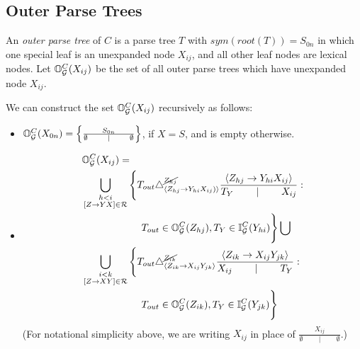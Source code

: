 \subsection{Outer Parse Trees}

\begin{defn}
  An \emph{outer parse tree} of $C$ is a parse tree $T$ with
  $sym(root(T)) = S_{0n}$ in which one special leaf is an unexpanded node
  $X_{ij}$, and all other leaf nodes are lexical nodes. Let
  $\mathbb{O}_{{\mathcal G}}^C(X_{ij})$ be the set of all outer parse trees which
  have unexpanded node $X_{ij}$.
\end{defn}

\begin{prop}
\label{prop-outer-set}
  We can construct the set $\mathbb{O}_{{\mathcal G}}^C(X_{ij})$ recursively as
  follows:
\begin{itemize}
\item $\mathbb{O}_{{\mathcal G}}^C(X_{0n}) = \left\{ \frac{S_{0n}}{\emptyset \qquad
      \mid \qquad \emptyset} \right\}$, if $X=S$, and is empty otherwise.
\item 
\begin{align*}
&\mathbb{O}_{{\mathcal G}}^C(X_{ij}) = \\
&\bigcup_{\substack{h < i \\ [Z \to YX]\in {\mathcal R}}}
\Bigg\{
T_{out} \triangle^{\cancel{Z_{hj}}}_{\langle Z_{hj} \to Y_{hi}
  X_{ij})\rangle} \frac{ \langle Z_{hj} \to Y_{hi}
  X_{ij} \rangle}{ T_Y \qquad \mid \qquad X_{ij}} : \\
&\qquad\qquad\qquad T_{out} \in \mathbb{O}_{{\mathcal G}}^C(Z_{hj}), T_Y \in \mathbb{I}_{{\mathcal G}}^C(Y_{hi}) 
\Bigg\} \bigcup\\
&\bigcup_{\substack{i < k \\ [Z \to
    XY]\in {\mathcal R}}}
\Bigg\{
T_{out} \triangle^{\cancel{Z_{ik}}}_{\langle Z_{ik} \to X_{ij} Y_{jk}
  \rangle} \frac{ \langle Z_{ik} \to X_{ij}
  Y_{jk} \rangle}{ X_{ij} \qquad \mid \qquad  T_Y } :\\
&\qquad\qquad\qquad T_{out} \in \mathbb{O}_{{\mathcal G}}^C(Z_{ik}),
 T_Y \in \mathbb{I}_{{\mathcal G}}^C(Y_{jk}) \Bigg\}\\
\end{align*}
(For notational simplicity above, we are writing $X_{ij}$ in
place of $\frac{X_{ij}}{\emptyset \qquad \mid \qquad
  \emptyset}$.)
\end{itemize}
\end{prop}
